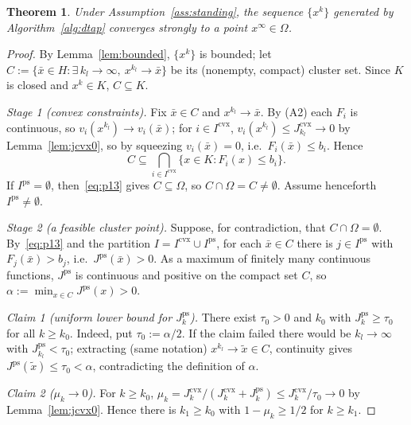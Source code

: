 \documentclass[]{interact}
\theoremstyle{plain}
\newtheorem{theorem}{Theorem}[section]
\theoremstyle{definition}
\theoremstyle{remark}
\newcommand{\cvx}{\mathrm{cvx}}
\newcommand{\ps}{\mathrm{ps}}
\begin{document}
\begin{theorem}\label{thm:strong}
Under Assumption~\ref{ass:standing}, the sequence $\{x^k\}$ generated by
Algorithm~\ref{alg:dtap} converges strongly to a point $x^\infty\in\Omega$.
\end{theorem}
\begin{proof}
By Lemma~\ref{lem:bounded}, $\{x^k\}$ is bounded; let
$C:=\{\bar x\in H:\exists\,k_l\to\infty,\ x^{k_l}\to\bar x\}$ be its (nonempty, compact)
cluster set. Since $K$ is closed and $x^k\in K$, $C\subseteq K$.

\emph{Stage 1 (convex constraints).} Fix $\bar x\in C$ and $x^{k_l}\to\bar x$. By (A2) each
$F_i$ is continuous, so $v_i(x^{k_l})\to v_i(\bar x)$; for $i\in I^{\cvx}$,
$v_i(x^{k_l})\le J^{\cvx}_{k_l}\to0$ by Lemma~\ref{lem:jcvx0}, so by squeezing
$v_i(\bar x)=0$, i.e.\ $F_i(\bar x)\le b_i$. Hence
\begin{equation}\label{eq:p13}
C\subseteq\bigcap_{i\in I^{\cvx}}\{x\in K:F_i(x)\le b_i\}.
\end{equation}
If $I^{\ps}=\emptyset$, then~\eqref{eq:p13} gives $C\subseteq\Omega$,
so $C\cap\Omega=C\ne\emptyset$.
Assume henceforth $I^{\ps}\ne\emptyset$.

\emph{Stage 2 (a feasible cluster point).} Suppose, for contradiction, that
$C\cap\Omega=\emptyset$. By~\eqref{eq:p13} and the partition $I=I^{\cvx}\cup I^{\ps}$, for
each $\bar x\in C$ there is $j\in I^{\ps}$ with $F_j(\bar x)>b_j$, i.e.\
$J^{\ps}(\bar x)>0$. As a maximum of finitely many continuous functions, $J^{\ps}$ is
continuous and positive on the compact set $C$, so $\alpha:=\min_{x\in C}J^{\ps}(x)>0$.

\smallskip
\emph{Claim 1 (uniform lower bound for $J^{\ps}_k$).} There exist $\tau_0>0$ and $k_0$
with $J^{\ps}_k\ge\tau_0$ for all $k\ge k_0$. Indeed, put $\tau_0:=\alpha/2$. If the claim
failed there would be $k_l\to\infty$ with $J^{\ps}_{k_l}<\tau_0$; extracting (same
notation) $x^{k_l}\to\tilde x\in C$, continuity gives $J^{\ps}(\tilde x)\le\tau_0<\alpha$,
contradicting the definition of $\alpha$.

\smallskip
\emph{Claim 2 ($\mu_k\to0$).} For $k\ge k_0$,
$\mu_k=J^{\cvx}_k/(J^{\cvx}_k+J^{\ps}_k)\le J^{\cvx}_k/\tau_0\to0$ by
Lemma~\ref{lem:jcvx0}. Hence there is $k_1\ge k_0$ with $1-\mu_k\ge1/2$ for $k\ge k_1$.


\end{proof}
\end{document}
